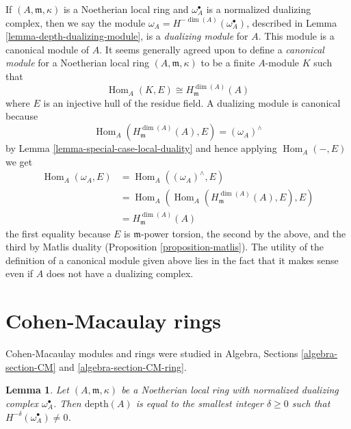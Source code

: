 \documentclass{stacks-project}
\theoremstyle{plain}
\newtheorem{lemma}[subsection]{Lemma}
\theoremstyle{definition}
\theoremstyle{remark}
\numberwithin{equation}{subsection}
\def\Hom{\mathop{\mathrm{Hom}}\nolimits}
\begin{document}
\noindent
If $(A, \mathfrak m, \kappa)$ is a Noetherian local ring and
$\omega_A^\bullet$ is a normalized dualizing complex, then
we say the module $\omega_A = H^{-\dim(A)}(\omega_A^\bullet)$, described
in Lemma \ref{lemma-depth-dualizing-module},
is a {\it dualizing module}
for $A$. This module is a canonical module of $A$.
It seems generally agreed upon to define a {\it canonical module}
for a Noetherian local ring $(A, \mathfrak m, \kappa)$ to be
a finite $A$-module $K$ such that
$$
\Hom_A(K, E) \cong H^{\dim(A)}_\mathfrak m(A)
$$
where $E$ is an injective hull of the residue field. A dualizing
module is canonical because
$$
\Hom_A(H^{\dim(A)}_\mathfrak m(A), E) = (\omega_A)^\wedge
$$
by Lemma \ref{lemma-special-case-local-duality}
and hence applying
$\Hom_A(-, E)$ we get
\begin{align*}
\Hom_A(\omega_A, E)
& =
\Hom_A((\omega_A)^\wedge, E) \\
& =
\Hom_A(\Hom_A(H^{\dim(A)}_\mathfrak m(A), E), E) \\
& = H^{\dim(A)}_\mathfrak m(A)
\end{align*}
the first equality because $E$ is $\mathfrak m$-power torsion, the
second by the above, and the third by Matlis duality
(Proposition \ref{proposition-matlis}).
The utility of the definition
of a canonical module given above lies in the fact that it makes sense
even if $A$ does not have a dualizing complex.




\section{Cohen-Macaulay rings}
\label{section-CM}

\noindent
Cohen-Macaulay modules and rings were studied in
Algebra, Sections \ref{algebra-section-CM} and \ref{algebra-section-CM-ring}.

\begin{lemma}
\label{lemma-depth-in-terms-dualizing-complex}
Let $(A, \mathfrak m, \kappa)$ be a Noetherian local ring with
normalized dualizing complex $\omega_A^\bullet$.
Then $\text{depth}(A)$ is equal to the smallest integer $\delta \geq 0$
such that $H^{-\delta}(\omega_A^\bullet) \not = 0$.
\end{lemma}
\end{document}
